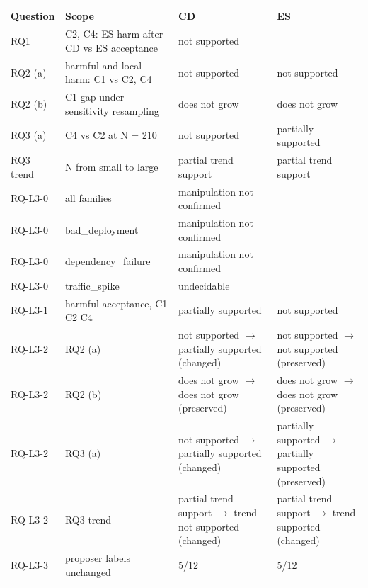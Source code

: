 \begin{tabular}{llll}
\toprule
Question & Scope & CD & ES \\
\midrule
RQ1 & C2, C4: ES harm after CD vs ES acceptance & not supported &  \\
RQ2 (a) & harmful and local harm: C1 vs C2, C4 & not supported & not supported \\
RQ2 (b) & C1 gap under sensitivity resampling & does not grow & does not grow \\
RQ3 (a) & C4 vs C2 at N = 210 & not supported & partially supported \\
RQ3 trend & N from small to large & partial trend support & partial trend support \\
RQ-L3-0 & all families & manipulation not confirmed &  \\
RQ-L3-0 & bad\_deployment & manipulation not confirmed &  \\
RQ-L3-0 & dependency\_failure & manipulation not confirmed &  \\
RQ-L3-0 & traffic\_spike & undecidable &  \\
RQ-L3-1 & harmful acceptance, C1 C2 C4 & partially supported & not supported \\
RQ-L3-2 & RQ2 (a) & not supported $\rightarrow$ partially supported (changed) & not supported $\rightarrow$ not supported (preserved) \\
RQ-L3-2 & RQ2 (b) & does not grow $\rightarrow$ does not grow (preserved) & does not grow $\rightarrow$ does not grow (preserved) \\
RQ-L3-2 & RQ3 (a) & not supported $\rightarrow$ partially supported (changed) & partially supported $\rightarrow$ partially supported (preserved) \\
RQ-L3-2 & RQ3 trend & partial trend support $\rightarrow$ trend not supported (changed) & partial trend support $\rightarrow$ trend supported (changed) \\
RQ-L3-3 & proposer labels unchanged & 5/12 & 5/12 \\
\bottomrule
\end{tabular}
